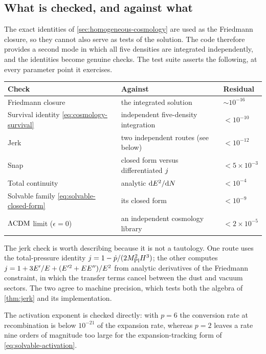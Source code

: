 \subsection{What is checked, and against what}\label{app:numerics-checks}

The exact identities of \cref{sec:homogeneous-cosmology} are used as the
Friedmann closure, so they cannot also serve as tests of the solution. The
code therefore provides a second mode in which all five densities are
integrated independently, and the identities become genuine checks. The test
suite asserts the following, at every parameter point it exercises.

\begin{center}
\begin{tabular}{lll}
  \toprule
  Check & Against & Residual \\
  \midrule
  Friedmann closure & the integrated solution & $\sim10^{-16}$ \\
  Survival identity \cref{eq:cosmology-survival}
    & independent five-density integration & $<10^{-10}$ \\
  Jerk & two independent routes (see below) & $<10^{-12}$ \\
  Snap & closed form versus differentiated $j$ & $<5\times10^{-3}$ \\
  Total continuity & analytic $\mathrm{d} E^2/\mathrm{d}N$ & $<10^{-4}$ \\
  Solvable family \cref{eq:solvable-closed-form}
    & its closed form & $<10^{-9}$ \\
  $\Lambda\mathrm{CDM}$ limit ($\epsilon=0$) & an independent cosmology library & $<2\times10^{-5}$ \\
  \bottomrule
\end{tabular}
\end{center}

The jerk check is worth describing because it is not a tautology. One route
uses the total-pressure identity $j=1-\dot p/(2M_{\mathrm{Pl}}^2H^3)$; the other
computes $j=1+3E'/E+(E'^2+EE'')/E^2$ from analytic derivatives of the
Friedmann constraint, in which the transfer terms cancel between the dust and
vacuum sectors. The two agree to machine precision, which tests both the
algebra of \cref{thm:jerk} and its implementation.

The activation exponent is checked directly: with $p=6$ the conversion rate at
recombination is below $10^{-21}$ of the expansion rate, whereas $p=2$ leaves a
rate nine orders of magnitude too large for the expansion-tracking form of
\cref{eq:solvable-activation}.

